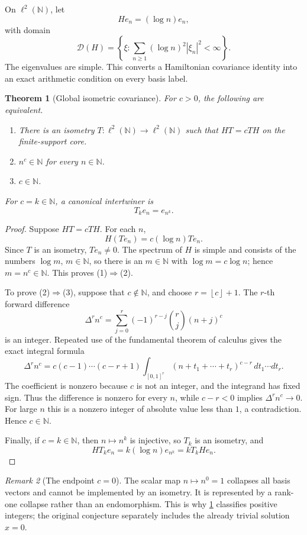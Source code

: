 \documentclass[11pt,oneside]{article}
\newtheorem{theorem}{Theorem}[section]
\theoremstyle{definition}
\theoremstyle{remark}
\newtheorem{remark}[theorem]{Remark}
\newcommand{\N}{\mathbb N}
\newcommand{\floor}[1]{\left\lfloor #1\right\rfloor}
\begin{document}
On \(\ell^2(\N)\), let
\[
        He_n=(\log n)e_n,
\]
with domain
\[
        \mathcal D(H)
        =\left\{\xi:\sum_{n\geq1}(\log n)^2|\xi_n|^2<\infty\right\}.
\]
The eigenvalues are simple.  This converts a Hamiltonian covariance
identity into an exact arithmetic condition on every basis label.

\begin{theorem}[Global isometric covariance]\label{thm:global-isometry}
For \(c>0\), the following are equivalent.
\begin{enumerate}
\item There is an isometry \(T:\ell^2(\N)\to\ell^2(\N)\) such that
      \(HT=cTH\) on the finite-support core.
\item \(n^c\in\N\) for every \(n\in\N\).
\item \(c\in\N\).
\end{enumerate}
For \(c=k\in\N\), a canonical intertwiner is
\[
        T_k e_n=e_{n^k}.
\]
\end{theorem}

\begin{proof}
Suppose \(HT=cTH\).  For each \(n\),
\[
        H(Te_n)=c(\log n)Te_n.
\]
Since \(T\) is an isometry, \(Te_n\neq0\).  The spectrum of \(H\) is
simple and consists of the numbers \(\log m\), \(m\in\N\), so there is
an \(m\in\N\) with
\(\log m=c\log n\); hence \(m=n^c\in\N\).  This proves (1)\(\Rightarrow\)(2).

To prove (2)\(\Rightarrow\)(3), suppose that \(c\notin\N\), and choose
\(r=\floor{c}+1\).  The \(r\)-th forward difference
\[
        \Delta^r n^c
        =\sum_{j=0}^{r}(-1)^{r-j}\binom rj(n+j)^c
\]
is an integer.  Repeated use of the fundamental theorem of calculus
gives the exact integral formula
\[
 \Delta^r n^c
 =c(c-1)\cdots(c-r+1)
  \int_{[0,1]^r}
  (n+t_1+\cdots+t_r)^{c-r}\,dt_1\cdots dt_r.
\]
The coefficient is nonzero because \(c\) is not an integer, and the
integrand has fixed sign.  Thus the difference is nonzero for every
\(n\), while \(c-r<0\) implies \(\Delta^r n^c\to0\).  For large \(n\)
this is a nonzero integer of absolute value less than \(1\), a
contradiction.  Hence \(c\in\N\).

Finally, if \(c=k\in\N\), then \(n\mapsto n^k\) is injective, so \(T_k\)
is an isometry, and
\[
        HT_ke_n=k(\log n)e_{n^k}=kT_kHe_n.
\]
\end{proof}

\begin{remark}[The endpoint \(c=0\)]
The scalar map \(n\mapsto n^0=1\) collapses all basis vectors and cannot
be implemented by an isometry.  It is represented by a rank-one
collapse rather than an endomorphism.  This is why
\cref{thm:global-isometry} classifies positive integers; the original
conjecture separately includes the already trivial solution \(x=0\).
\end{remark}
\end{document}
